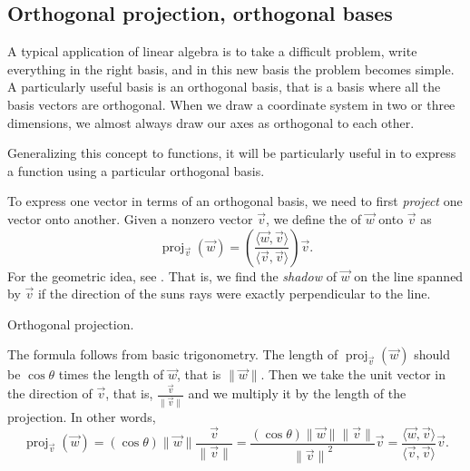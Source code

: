 \subsection{Orthogonal projection, orthogonal bases}

A typical application of linear algebra is to take a difficult problem,
write everything in the right basis, and in this new basis the problem
becomes simple.  A particularly useful basis is an orthogonal basis, that is
a basis where all the basis vectors are orthogonal.  When we draw a
coordinate system in two or three dimensions, we almost always draw our axes
as orthogonal to each other.

Generalizing this concept to functions,
it will be particularly useful in  to express a
function using a particular orthogonal basis.

To express one vector in terms of an orthogonal basis, we need to first
\emph{project} one vector onto another.
Given a nonzero vector $\vec{v}$, we define the
\emph{}
of $\vec{w}$ onto $\vec{v}$ as
\begin{equation*}
\operatorname{proj}_{\vec{v}}(\vec{w})
=
\left(
\frac{\langle \vec{w} , \vec{v} \rangle}{ \langle \vec{v} , \vec{v} \rangle}
\right)
\vec{v} .
\end{equation*}
For the geometric idea, see .  That is, we
find the \emph{shadow} of $\vec{w}$ on the line spanned by $\vec{v}$ if the
direction of the suns rays
were exactly perpendicular to the line. 

\begin{myfig}
\capstart
{}
\caption{Orthogonal projection.\label{vec-orthoproj:fig}}
\end{myfig}

The formula follows from basic trigonometry.  The length of
$\operatorname{proj}_{\vec{v}}(\vec{w})$ should be
$\cos \theta$ times the length of $\vec{w}$, that is $\lVert\vec{w}\rVert$.
Then we take the unit vector in the direction of $\vec{v}$, that is,
$\frac{\vec{v}}{\lVert \vec{v} \rVert}$ and we multiply it by the length of
the projection.  In other words,
\begin{equation*}
\operatorname{proj}_{\vec{v}}(\vec{w})
=
(\cos \theta) \lVert \vec{w} \rVert
\frac{\vec{v}}{\lVert \vec{v} \rVert}
=
\frac{(\cos \theta) \lVert \vec{w} \rVert \lVert \vec{v} \rVert}{
{\lVert \vec{v} \rVert}^2
}
\vec{v}
=
\frac{\langle \vec{w}, \vec{v} \rangle}{
\langle \vec{v}, \vec{v} \rangle
}
\vec{v} .
\end{equation*}


